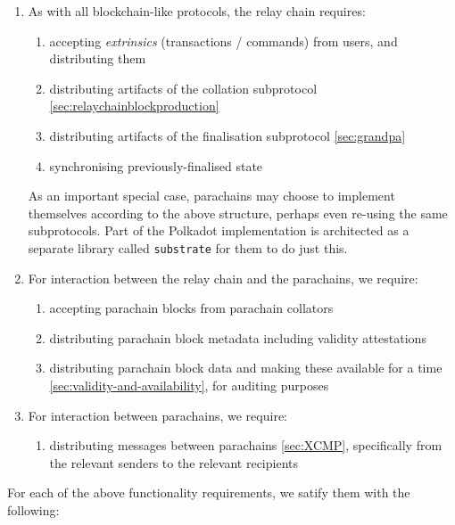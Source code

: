 \begin{enumerate}

\item As with all blockchain-like protocols, the relay chain requires:
  \begin{enumerate}
    \item accepting \emph{extrinsics} (transactions / commands) from users, and distributing them
    \item distributing artifacts of the collation subprotocol \ref{sec:relaychainblockproduction}
    \item distributing artifacts of the finalisation subprotocol \ref{sec:grandpa}
    \item synchronising previously-finalised state
  \end{enumerate}

As an important special case, parachains may choose to implement themselves
according to the above structure, perhaps even re-using the same subprotocols.
Part of the Polkadot implementation is architected as a separate library called
\texttt{substrate} for them to do just this.

\item For interaction between the relay chain and the parachains, we require:
  \begin{enumerate}
    \item accepting parachain blocks from parachain collators
    \item distributing parachain block metadata including validity attestations
    \item distributing parachain block data and making these available for a time \ref{sec:validity-and-availability}, for auditing purposes
  \end{enumerate}

\item For interaction between parachains, we require:
  \begin{enumerate}
    \item distributing messages between parachains \ref{sec:XCMP}, specifically from the relevant senders to the relevant recipients
  \end{enumerate}
\end{enumerate}

For each of the above functionality requirements, we satify them with the
following:

